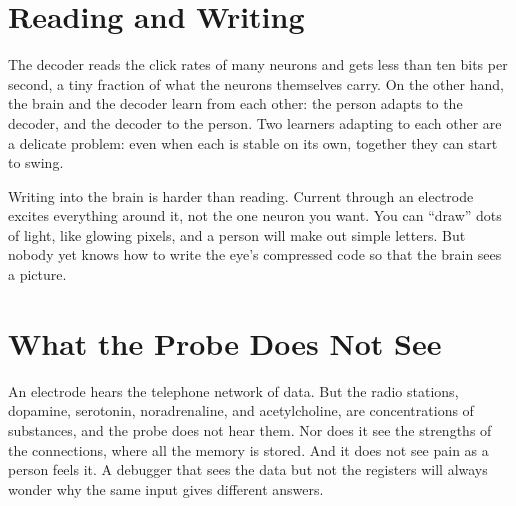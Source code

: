 \section*{Reading and Writing}

The decoder reads the click rates of many neurons and gets less than ten bits per second, a tiny fraction of what the neurons themselves carry. On the other hand, the brain and the decoder learn from each other: the person adapts to the decoder, and the decoder to the person. Two learners adapting to each other are a delicate problem: even when each is stable on its own, together they can start to swing.

Writing into the brain is harder than reading. Current through an electrode excites everything around it, not the one neuron you want. You can ``draw'' dots of light, like glowing pixels, and a person will make out simple letters. But nobody yet knows how to write the eye's compressed code so that the brain sees a picture.

\section*{What the Probe Does Not See}

An electrode hears the telephone network of data. But the radio stations, dopamine, serotonin, noradrenaline, and acetylcholine, are concentrations of substances, and the probe does not hear them. Nor does it see the strengths of the connections, where all the memory is stored. And it does not see pain as a person feels it. A debugger that sees the data but not the registers will always wonder why the same input gives different answers.

